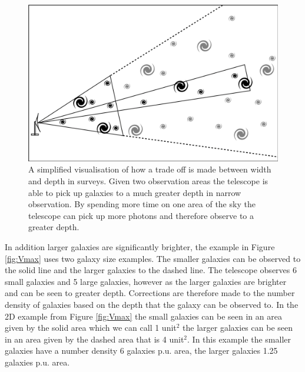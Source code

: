 \begin{figure}[h]
    \centering
    \includegraphics[width = \linewidth]{Figures/Chapter1/W_v_D_Toon.png}
    \caption{A simplified visualisation of how a trade off is made between width and depth in surveys. Given two observation areas the telescope is able to pick up galaxies to a much greater depth in narrow observation. By spending more time on one area of the sky the telescope can pick up more photons and therefore observe to a greater depth.}
    \label{fig:WvD}
\end{figure}

In addition larger galaxies are significantly brighter, the example in Figure \ref{fig:Vmax} uses two galaxy size examples. The smaller galaxies can be observed to the solid line and the larger galaxies to the dashed line. The telescope observes 6 small galaxies and 5 large galaxies, however as the larger galaxies are brighter and can be seen to greater depth. Corrections are therefore made to the number density of galaxies based on the depth that the galaxy can be observed to. In the 2D example from Figure \ref{fig:Vmax} the small galaxies can be seen in an area given by the solid area which we can call 1 unit$^2$ the larger galaxies can be seen in an area given by the dashed area that is 4 unit$^2$. In this example the smaller galaxies have a number density 6 galaxies p.u. area, the larger galaxies 1.25 galaxies p.u. area.


